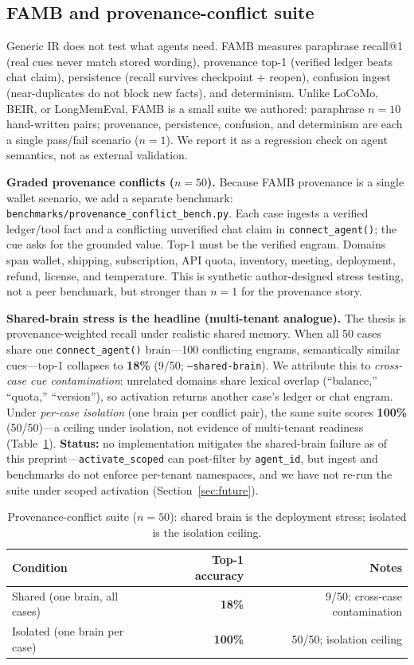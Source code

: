 \documentclass[11pt]{article}
\begin{document}
\subsection{FAMB and provenance-conflict suite}
Generic IR does not test what agents need. FAMB measures paraphrase recall@1
(real cues never match stored wording), provenance top-1 (verified ledger beats
chat claim), persistence (recall survives checkpoint + reopen), confusion ingest
(near-duplicates do not block new facts), and determinism. Unlike LoCoMo, BEIR,
or LongMemEval, FAMB is a small suite we authored: paraphrase $n{=}10$ hand-written
pairs; provenance, persistence, confusion, and determinism are each a single
pass/fail scenario ($n{=}1$). We report it as a regression check on agent semantics,
not as external validation.

\textbf{Graded provenance conflicts ($n{=}50$).} Because FAMB provenance is a
single wallet scenario, we add a separate benchmark:
\texttt{benchmarks/provenance\_conflict\_bench.py}. Each case ingests a verified
ledger/tool fact and a conflicting unverified chat claim in
\texttt{connect\_agent()}; the cue asks for the grounded value. Top-1 must be the
verified engram. Domains span wallet, shipping, subscription, API quota,
inventory, meeting, deployment, refund, license, and temperature. This is
synthetic author-designed stress testing, not a peer benchmark, but stronger than
$n{=}1$ for the provenance story.

\textbf{Shared-brain stress is the headline (multi-tenant analogue).} The thesis is
provenance-weighted recall under realistic shared memory. When all 50 cases share
one \texttt{connect\_agent()} brain---100 conflicting engrams, semantically similar
cues---top-1 collapses to \textbf{18\%} (9/50; \texttt{--shared-brain}). We
attribute this to \emph{cross-case cue contamination}: unrelated domains share
lexical overlap (``balance,'' ``quota,'' ``version''), so activation returns
another case's ledger or chat engram. Under \emph{per-case isolation} (one brain
per conflict pair), the same suite scores \textbf{100\%} (50/50)---a ceiling under
isolation, not evidence of multi-tenant readiness
(Table~\ref{tab:provenance-conditions}). \textbf{Status:} no implementation
mitigates the shared-brain failure as of this preprint---\texttt{activate\_scoped}
can post-filter by \texttt{agent\_id}, but ingest and benchmarks do not enforce
per-tenant namespaces, and we have not re-run the suite under scoped activation
(Section~\ref{sec:future}).

\begin{table}[h]
\centering
\caption{Provenance-conflict suite ($n{=}50$): shared brain is the deployment stress;
isolated is the isolation ceiling.}
\label{tab:provenance-conditions}
\begin{tabular}{lrr}
\toprule
Condition & Top-1 accuracy & Notes \\
\midrule
Shared (one brain, all cases) & \textbf{18\%} & 9/50; cross-case contamination \\
Isolated (one brain per case) & \textbf{100\%} & 50/50; isolation ceiling \\
\bottomrule
\end{tabular}
\end{table}
\end{document}
